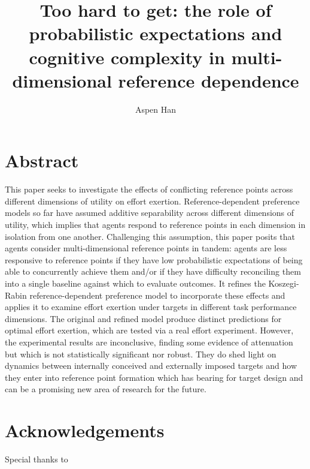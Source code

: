 \documentclass[
  12,
  letterpaper,
  DIV=11,
  numbers=noendperiod]{scrartcl}
\title{Too hard to get: the role of probabilistic expectations and
cognitive complexity in multi-dimensional reference dependence}
\author{Aspen Han}
\date{}
\begin{document}
\maketitle


\newpage

\section{Abstract}\label{abstract}

This paper seeks to investigate the effects of conflicting reference
points across different dimensions of utility on effort exertion.
Reference-dependent preference models so far have assumed additive
separability across different dimensions of utility, which implies that
agents respond to reference points in each dimension in isolation from
one another. Challenging this assumption, this paper posits that agents
consider multi-dimensional reference points in tandem: agents are less
responsive to reference points if they have low probabilistic
expectations of being able to concurrently achieve them and/or if they
have difficulty reconciling them into a single baseline against which to
evaluate outcomes. It refines the Koszegi-Rabin reference-dependent
preference model to incorporate these effects and applies it to examine
effort exertion under targets in different task performance dimensions.
The original and refined model produce distinct predictions for optimal
effort exertion, which are tested via a real effort experiment. However,
the experimental results are inconclusive, finding some evidence of
attenuation but which is not statistically significant nor robust. They
do shed light on dynamics between internally conceived and externally
imposed targets and how they enter into reference point formation which
has bearing for target design and can be a promising new area of
research for the future.

\newpage

\section{Acknowledgements}\label{acknowledgements}

Special thanks to
\end{document}
